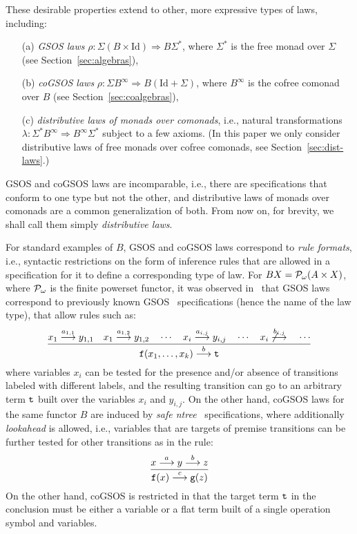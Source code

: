 \documentclass[adraft,copyright,creativecommons]{eptcs}
\newcommand{\To}{\Longrightarrow}
\newcommand{\Bb}{B^{\infty}}
\newcommand{\Ss}{\Sigma^*}
\renewcommand{\S}{\Sigma}
\newcommand{\Id}{\textrm{Id}}
\newcommand{\goes}[1]{\stackrel{#1}{\longrightarrow}}
\newcommand{\Pf}{{\cal P}_{\omega}}
\begin{document}
These desirable properties extend to other, more expressive types of laws, including:
\begin{itemize}
\item[(a)] {\em GSOS laws} $\rho:\S(B\times\Id)\To B\Ss$, where $\Ss$ is the free monad over $\S$ (see Section~\ref{sec:algebras}),
\item[(b)] {\em coGSOS laws} $\rho:\S\Bb\To B(\Id+\S)$, where $\Bb$ is the cofree comonad over $B$ (see Section~\ref{sec:coalgebras}),
\item[(c)] {\em distributive laws of monads over comonads}, i.e., natural transformations $\lambda:\Ss\Bb\To\Bb\Ss$ subject to a few axioms.  (In this paper we only consider distributive laws of free monads over cofree comonads, see Section~\ref{sec:dist-laws}.)
\end{itemize}
GSOS and coGSOS laws are incomparable, i.e., there are specifications that conform to one type but not the other, and distributive laws of monads over comonads are a common generalization of both. From now on, for brevity, we shall call them simply {\em distributive laws}. 

For standard examples of $B$, GSOS and coGSOS laws correspond to {\em rule formats}, i.e., syntactic restrictions on the form of inference rules that are allowed in a specification for it to define a corresponding type of law. For $BX=\Pf(A\times X)$, where $\Pf$ is the finite powerset functor, it was observed in~\cite{turiplotkin} that GSOS laws correspond to previously known GSOS~\cite{gsos} specifications (hence the name of the law type), that allow rules such as:
\[
	\dfrac{x_1\goes{a_{1,1}}y_{1,1} \quad x_1\goes{a_{1,2}}y_{1,2} \quad\cdots\quad x_i\goes{a_{i,j}}y_{i,j} \quad \cdots\quad x_i\not\goes{b_{i,j}}\quad\cdots}{{\tt f}(x_1,\ldots, x_k)\goes{b} {\tt t}}
\]
where variables $x_i$ can be tested for the presence and/or absence of transitions labeled with different labels, and the resulting transition can go to an arbitrary term ${\tt t}$ built over the variables $x_i$ and $y_{i,j}$. On the other hand, coGSOS laws for the same functor $B$ are induced by {\em safe ntree}~\cite{ntree,turiplotkin} specifications, where additionally {\em lookahead} is allowed, i.e., variables that are targets of premise transitions can be further tested for other transitions as in the rule:
\[
	\dfrac{x\goes{a} y \goes{b}z}{{\tt f}(x)\goes{c}{\tt g}(z)}
\]
On the other hand, coGSOS is restricted in that the target term ${\tt t}$ in the conclusion must be either a variable or a flat term built of a single operation symbol and variables.
\end{document}
